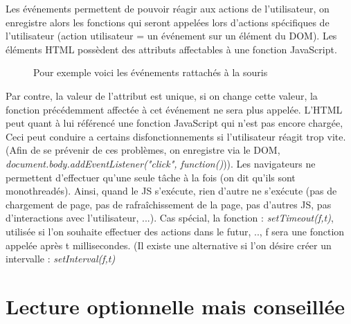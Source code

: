 \documentclass{article}[12pt]
\begin{document}
Les événements 	permettent de pouvoir réagir aux actions de l'utilisateur, on enregistre alors les fonctions qui seront appelées lors d'actions spécifiques de l'utilisateur (action utilisateur = un événement sur un élément du DOM).
\newline
\newline
Les éléments HTML possèdent des attributs affectables à une fonction JavaScript.
\begin{figure}[H]
	\centering
    \caption{Pour exemple voici les événements rattachés à la souris}
\end{figure}
 Par contre, la valeur de l'attribut est unique, si on change cette valeur, la fonction précédemment affectée à cet événement ne sera plus appelée. L'HTML peut quant à lui référencé une fonction JavaScript qui n'est pas encore chargée, Ceci peut conduire a certains disfonctionnements si l'utilisateur réagit trop vite. (Afin de se prévenir de ces problèmes, on enregistre via le DOM, \emph{document.body.addEventListener("click", function(){}})).
\newline
\newline
Les navigateurs ne permettent d'effectuer qu'une seule tâche à la fois (on dit qu'ils sont monothreadés). Ainsi, quand le JS s'exécute, rien d'autre ne s'exécute (pas de chargement de page, pas de rafraîchissement de la page, pas d'autres JS, pas d'interactions avec l'utilisateur, ...).
\newline
\newline
Cas spécial, la fonction : \emph{setTimeout(f,t)}, utilisée si l'on souhaite effectuer des actions dans le futur, .., f sera une fonction appelée après t millisecondes. (Il existe une alternative si l'on désire créer un intervalle : \emph{setInterval(f,t)}

\section{Lecture optionnelle mais conseillée}
\end{document}
